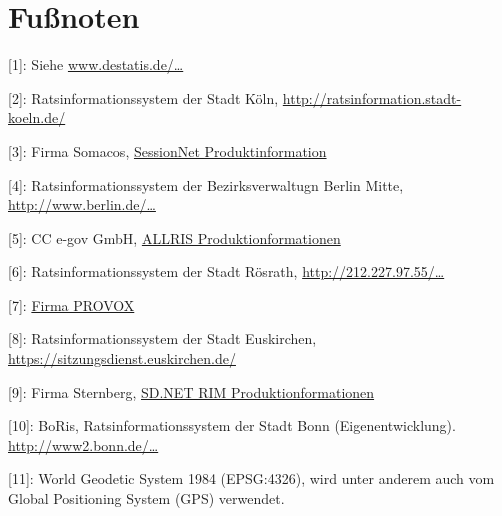 \documentclass[,a4paper]{article}
\begin{document}
\section{Fußnoten}

{[}1{]}: Siehe
\href{https://www.destatis.de/DE/Methoden/Klassifikationen/Bevoelkerung/StaatsangehoerigkeitGebietsschluessel.html}{www.destatis.de/\ldots{}}

{[}2{]}: Ratsinformationssystem der Stadt Köln,
\href{http://ratsinformation.stadt-koeln.de/}{http://ratsinformation.stadt-koeln.de/}

{[}3{]}: Firma Somacos,
\href{http://www.somacos.de/de/sitzungsdienst/ratsinfo.html}{SessionNet
Produktinformation}

{[}4{]}: Ratsinformationssystem der Bezirksverwaltugn Berlin Mitte,
\href{http://www.berlin.de/ba-mitte/bvv-online/allris.net.asp}{http://www.berlin.de/\ldots{}}

{[}5{]}: CC e-gov GmbH, \href{http://www.cc-egov.de/allris.htm}{ALLRIS
Produktionformationen}

{[}6{]}: Ratsinformationssystem der Stadt Rösrath,
\href{http://212.227.97.55/ratsinfo/roesrath}{http://212.227.97.55/\ldots{}}

{[}7{]}: \href{http://www.provox.de/}{Firma PROVOX}

{[}8{]}: Ratsinformationssystem der Stadt Euskirchen,
\href{https://sitzungsdienst.euskirchen.de/}{https://sitzungsdienst.euskirchen.de/}

{[}9{]}: Firma Sternberg,
\href{http://www.sitzungsdienst.net/produkte/ratsinformationsmanagement}{SD.NET
RIM Produktionformationen}

{[}10{]}: BoRis, Ratsinformationssystem der Stadt Bonn
(Eigenentwicklung).
\href{http://www2.bonn.de/bo\_ris/ris\_sql/agm\_index.asp}{http://www2.bonn.de/\ldots{}}

{[}11{]}: World Geodetic System 1984 (EPSG:4326), wird unter anderem
auch vom Global Positioning System (GPS) verwendet.
\end{document}

